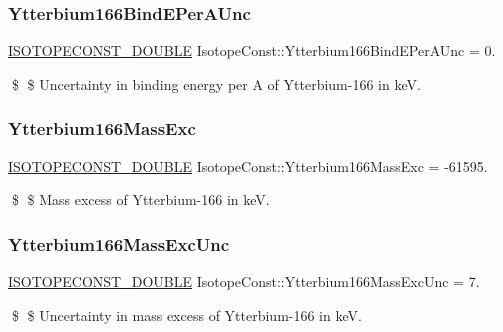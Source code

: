 \subsubsection{\texorpdfstring{Ytterbium166\+Bind\+E\+Per\+A\+Unc}{Ytterbium166BindEPerAUnc}}
{\footnotesize\ttfamily \mbox{\hyperlink{group___isotope_const-_macros_ga8f45a7272ce02c0b4c65c44636ed719a}{I\+S\+O\+T\+O\+P\+E\+C\+O\+N\+S\+T\+\_\+\+D\+O\+U\+B\+LE}} Isotope\+Const\+::\+Ytterbium166\+Bind\+E\+Per\+A\+Unc = 0.}

\$ \$ Uncertainty in binding energy per A of Ytterbium-\/166 in keV. \mbox{\label{group___isotope_const-_ytterbium-_yb166_ga886507007aa0d17ef6f6a0cb54524b4d}} 
\subsubsection{\texorpdfstring{Ytterbium166\+Mass\+Exc}{Ytterbium166MassExc}}
{\footnotesize\ttfamily \mbox{\hyperlink{group___isotope_const-_macros_ga8f45a7272ce02c0b4c65c44636ed719a}{I\+S\+O\+T\+O\+P\+E\+C\+O\+N\+S\+T\+\_\+\+D\+O\+U\+B\+LE}} Isotope\+Const\+::\+Ytterbium166\+Mass\+Exc = -\/61595.}

\$ \$ Mass excess of Ytterbium-\/166 in keV. \mbox{\label{group___isotope_const-_ytterbium-_yb166_ga8b8cdf7b0499750fa48d999e1d45a281}} 
\subsubsection{\texorpdfstring{Ytterbium166\+Mass\+Exc\+Unc}{Ytterbium166MassExcUnc}}
{\footnotesize\ttfamily \mbox{\hyperlink{group___isotope_const-_macros_ga8f45a7272ce02c0b4c65c44636ed719a}{I\+S\+O\+T\+O\+P\+E\+C\+O\+N\+S\+T\+\_\+\+D\+O\+U\+B\+LE}} Isotope\+Const\+::\+Ytterbium166\+Mass\+Exc\+Unc = 7.}

\$ \$ Uncertainty in mass excess of Ytterbium-\/166 in keV. \mbox{\label{group___isotope_const-_ytterbium-_yb166_gabdab157f54085615b089a714bcaa190e}} 
